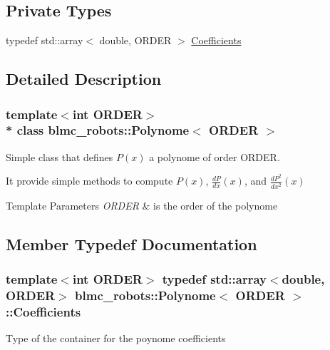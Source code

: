 \subsection*{Private Types}
\begin{DoxyCompactItemize}
\item 
typedef std\+::array$<$ double, O\+R\+D\+ER $>$ \hyperlink{classblmc__robots_1_1Polynome_a31e086184f3934b269e8318cce2859eb}{Coefficients}
\end{DoxyCompactItemize}


\subsection{Detailed Description}
\subsubsection*{template$<$int O\+R\+D\+ER$>$\\*
class blmc\+\_\+robots\+::\+Polynome$<$ O\+R\+D\+E\+R $>$}

Simple class that defines $ P(x) $ a polynome of order O\+R\+D\+ER. 

It provide simple methods to compute $ P(x) $, $ \frac{dP}{dx}(x) $, and $ \frac{dP^2}{dx^2}(x) $


\begin{DoxyTemplParams}{Template Parameters}
{\em O\+R\+D\+ER} & is the order of the polynome \\
\hline
\end{DoxyTemplParams}


\subsection{Member Typedef Documentation}
\subsubsection[{\texorpdfstring{Coefficients}{Coefficients}}]{\setlength{\rightskip}{0pt plus 5cm}template$<$int O\+R\+D\+ER$>$ typedef std\+::array$<$double, O\+R\+D\+ER$>$ {\bf blmc\+\_\+robots\+::\+Polynome}$<$ O\+R\+D\+ER $>$\+::{\bf Coefficients}\hspace{0.3cm}{\ttfamily [private]}}\hypertarget{classblmc__robots_1_1Polynome_a31e086184f3934b269e8318cce2859eb}{}\label{classblmc__robots_1_1Polynome_a31e086184f3934b269e8318cce2859eb}
Type of the container for the poynome coefficients 

